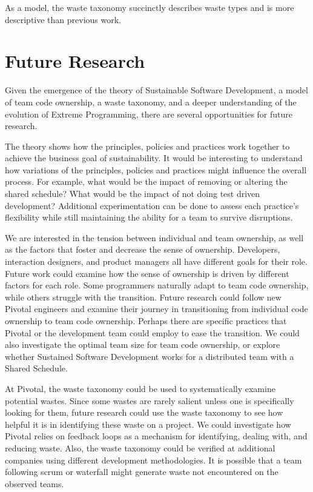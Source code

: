 As a model, the waste taxonomy succinctly describes waste types and is more descriptive than previous work. 


\section{Future Research}
Given the emergence of the theory of Sustainable Software Development, a model of team code ownership, a waste taxonomy, and a deeper understanding of the evolution of Extreme Programming, there are several opportunities for future research.


The theory shows how the principles, policies and practices work together to achieve the business goal of sustainability. It would be interesting to understand how variations of the principles, policies and practices might influence the overall process. For example, what would be the impact of removing or altering the shared schedule? What would be the impact of not doing test driven development? Additional experimentation can be done to assess each practice's flexibility while still maintaining the ability for a team to survive disruptions. 


We are interested in the tension between individual and team ownership, as well as the factors that foster and decrease the sense of ownership. Developers, interaction designers, and product managers all have different goals for their role. Future work could examine how the sense of ownership is driven by different factors for each role. Some programmers naturally adapt to team code ownership, while others struggle with the transition. Future research could follow new Pivotal engineers and examine their journey in transitioning from individual code ownership to team code ownership. Perhaps there are specific practices that Pivotal or the development team could employ to ease the transition. We could also investigate the optimal team size for team code ownership, or explore whether Sustained Software Development works for a distributed team with a Shared Schedule.


At Pivotal, the waste taxonomy could be used to systematically examine potential wastes. Since some wastes are rarely salient unless one is specifically looking for them, future research could use the waste taxonomy to see how helpful it is in identifying these waste on a project. We could investigate how Pivotal relies on feedback loops as a mechanism for identifying, dealing with, and reducing waste. Also, the waste taxonomy could be verified at additional companies using different development methodologies. It is possible that a team following scrum or waterfall might generate waste not encountered on the observed teams. 


